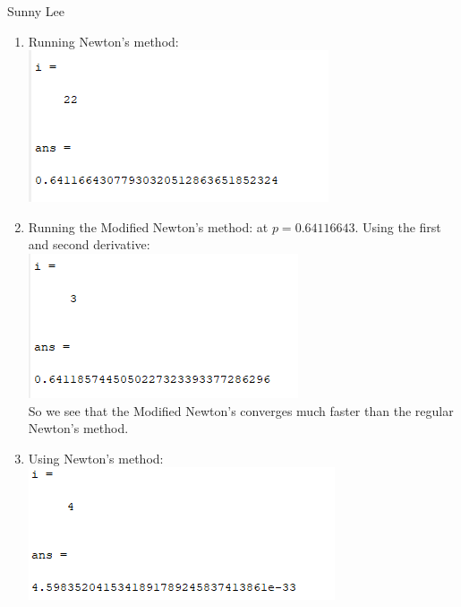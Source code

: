 \documentclass[12pt,letterpaper]{article}
\begin{document}
    Sunny Lee

    \begin{enumerate}
        \item Running Newton's method: \\
        \includegraphics{number1.png}
        \item 
        Running the Modified Newton's method:
        at $p = 0.64116643$. Using the first and second derivative: \\
        \includegraphics{number2.png}\\
        So we see that the Modified Newton's converges much faster than the regular
        Newton's method. 
        
        \item
        Using Newton's method: \\
        \includegraphics{number3.png}


\end{enumerate}
\end{document}
